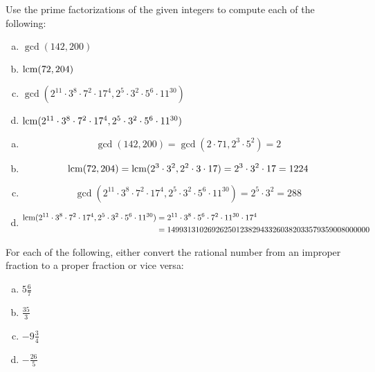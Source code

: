 \documentclass[11pt,letterpaper]{article}
\begin{document}
\newpage



 Use the prime factorizations of the given integers to compute each of the following:
        \begin{enumerate}[(a)]
        \item $\gcd(142, 200)$
        \item $\operatorname{lcm}(72, 204)$
        \item $\gcd(2^{11} \cdot 3^8 \cdot 7^2 \cdot 17^4, 2^5 \cdot 3^2 \cdot 5^6 \cdot 11^{30})$
        \item $\operatorname{lcm}(2^{11} \cdot 3^8 \cdot 7^2 \cdot 17^4, 2^5 \cdot 3^2 \cdot 5^6 \cdot 11^{30})$
        \end{enumerate} \pspace

\sol
\begin{enumerate}[(a)]
\item 
	\[
	\gcd(142, 200)= \gcd(2 \cdot 71, 2^3 \cdot 5^2)= 2
	\] \pspace

\item 
	\[
	\operatorname{lcm}(72, 204)= \operatorname{lcm}(2^3 \cdot 3^2, 2^2 \cdot 3 \cdot 17)= 2^3 \cdot 3^2 \cdot 17= 1224
	\] \pspace

\item 
	\[
	\gcd(2^{11} \cdot 3^8 \cdot 7^2 \cdot 17^4, 2^5 \cdot 3^2 \cdot 5^6 \cdot 11^{30})= 2^5 \cdot 3^2= 288
	\] \pspace

\item 
	\[
	\begin{aligned}
	\operatorname{lcm}(2^{11} \cdot 3^8 \cdot 7^2 \cdot 17^4, 2^5 \cdot 3^2 \cdot 5^6 \cdot 11^{30})&= 2^{11} \cdot 3^8 \cdot 5^6 \cdot 7^2 \cdot 11^{30} \cdot 17^4 \\
	&= 14993131026926250123829433260382033579359008000000
	\end{aligned}
	\] 
\end{enumerate}



\newpage



 For each of the following, either convert the rational number from an improper fraction to a proper fraction or vice versa:
	\begin{enumerate}[(a)]
	\item $5\frac{6}{7}$
	\item $\frac{35}{3}$
	\item $-9\frac{3}{4}$
	\item $-\frac{26}{5}$
	\end{enumerate} \pspace
\end{document}
